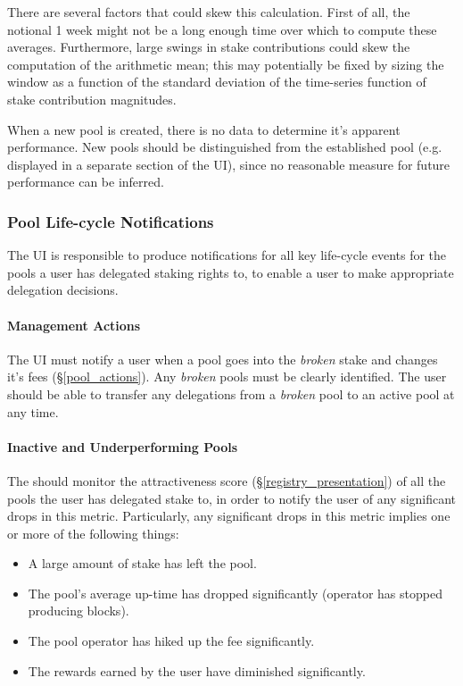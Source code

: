 There are several factors that could skew this calculation. First of all, the notional 1 week might not be a long enough time over which to compute these averages. Furthermore, large swings in stake contributions could skew the computation of the arithmetic mean; this may potentially be fixed by sizing the window as a function of the standard deviation of the time-series function of stake contribution magnitudes. 

When a new pool is created, there is no data to determine it's apparent performance. New pools should be distinguished from the established pool (e.g. displayed in a separate section of the UI), since no reasonable measure for future performance can be inferred. 

\subsubsection{Pool Life-cycle Notifications}
The UI is responsible to produce notifications for all key life-cycle events for the pools a user has delegated staking rights to, to enable a user to make appropriate delegation decisions. 

\paragraph{Management Actions}
The UI must notify a user when a pool goes into the \textit{broken} stake and changes it's fees (\S\ref{pool_actions}). Any \textit{broken} pools must be clearly identified. The user should be able to transfer any delegations from a \textit{broken}  pool to an active pool at any time. 

\paragraph{Inactive and Underperforming Pools}
The should monitor the attractiveness score (\S\ref{registry_presentation}) of all the pools the user has delegated stake to, in order to notify the user of any significant drops in this metric. Particularly, any significant drops in this metric implies one or more of the following things: 
\begin{itemize}[label=--,nosep]
    \item A large amount of stake has left the pool.
    \item The pool's average up-time has dropped significantly (operator has stopped producing blocks). 
    \item The pool operator has hiked up the fee significantly. 
    \item The rewards earned by the user have diminished significantly. 
\end{itemize}

